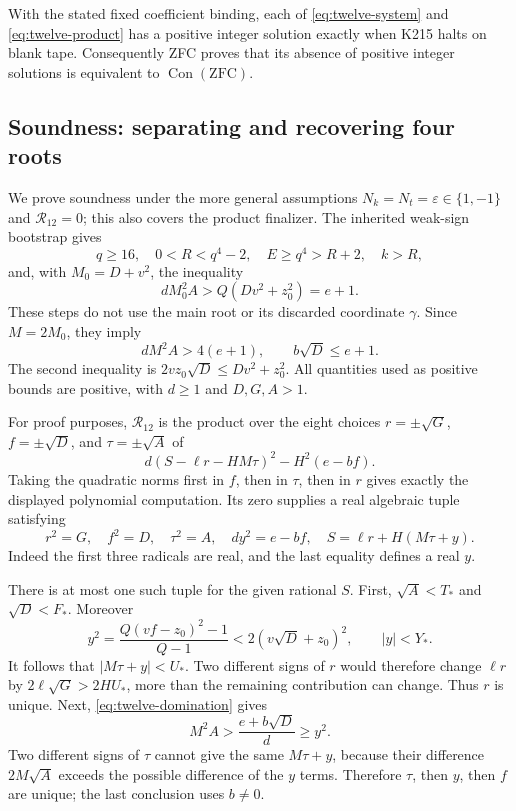 \begin{theorem}
With the stated fixed coefficient binding, each of
\eqref{eq:twelve-system} and \eqref{eq:twelve-product} has a positive
integer solution exactly when K215 halts on blank tape.  Consequently
ZFC proves that its absence of positive integer solutions is equivalent
to $\operatorname{Con}(\mathrm{ZFC})$.
\end{theorem}

\subsection{Soundness: separating and recovering four roots}

We prove soundness under the more general assumptions
$N_k=N_t=\varepsilon\in\{1,-1\}$ and $\mathcal R_{12}=0$;
this also covers the product finalizer.  The inherited weak-sign
bootstrap gives
\[
 q\ge16,\quad 0<R<q^4-2,\quad E\ge q^4>R+2,\quad k>R,
\]
and, with $M_0=D+v^2$, the inequality
\[
 dM_0^2A>Q(Dv^2+z_0^2)=e+1.
\]
These steps do not use the main root or its discarded coordinate
$\gamma$.  Since $M=2M_0$, they imply
\begin{equation}
 dM^2A>4(e+1),\qquad b\sqrt D\le e+1.
 \label{eq:twelve-domination}
\end{equation}
The second inequality is $2v z_0\sqrt D\le Dv^2+z_0^2$.
All quantities used as positive bounds are positive, with $d\ge1$ and
$D,G,A>1$.

For proof purposes, $\mathcal R_{12}$ is the product over the eight
choices $r=\pm\sqrt G$, $f=\pm\sqrt D$, and
$\tau=\pm\sqrt A$ of
\begin{equation}
 d(S-\ell r-HM\tau)^2-H^2(e-bf).
 \label{eq:twelve-branch-factor}
\end{equation}
Taking the quadratic norms first in $f$, then in $\tau$, then in $r$
gives exactly the displayed polynomial computation.  Its zero supplies
a real algebraic tuple satisfying
\begin{equation}
 r^2=G,\quad f^2=D,\quad\tau^2=A,\quad
 dy^2=e-bf,\quad S=\ell r+H(M\tau+y).
 \label{eq:twelve-radicals}
\end{equation}
Indeed the first three radicals are real, and the last equality defines
a real $y$.

There is at most one such tuple for the given rational $S$.  First,
$\sqrt A<T_*$ and $\sqrt D<F_*$.  Moreover
\[
 y^2=\frac{Q(vf-z_0)^2-1}{Q-1}
       <2(v\sqrt D+z_0)^2,
 \qquad |y|<Y_*.
\]
It follows that $|M\tau+y|<U_*$.  Two different signs of $r$ would
therefore change $\ell r$ by $2\ell\sqrt G>2HU_*$, more than the
remaining contribution can change.  Thus $r$ is unique.  Next,
\eqref{eq:twelve-domination} gives
\[
 M^2 A>\frac{e+b\sqrt D}{d}\ge y^2.
\]
Two different signs of $\tau$ cannot give the same $M\tau+y$,
because their difference $2M\sqrt A$ exceeds the possible difference
of the $y$ terms.  Therefore $\tau$, then $y$, then $f$ are unique;
the last conclusion uses $b\ne0$.

